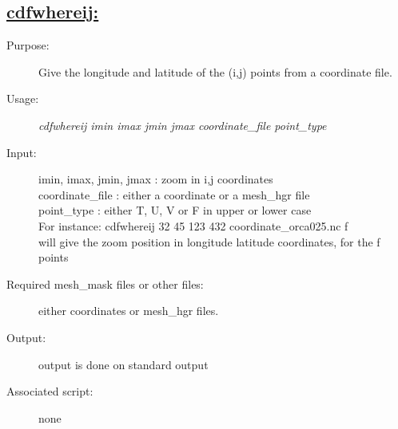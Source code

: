 \documentclass[a4paper,11pt]{article}
\begin{document}
\subsection*{\underline{cdfwhereij:}}
\begin{description}
\item[Purpose:] Give the longitude and latitude of the (i,j) points from a coordinate file.
\item[Usage:] {\em cdfwhereij  imin imax jmin jmax coordinate\_file point\_type }
\item[Input:] imin, imax, jmin, jmax : zoom in i,j coordinates \\
      coordinate\_file : either a coordinate or a mesh\_hgr file \\
      point\_type : either T, U, V or F in upper or lower case \\
For instance: cdfwhereij   32 45 123 432 coordinate\_orca025.nc f \\
will give the zoom position in longitude latitude coordinates, for the f points 
\item[Required mesh\_mask files or other files:] either coordinates or mesh\_hgr files.
\item[Output:] output is done on standard output
\item[Associated script:] none
\end{description}

\newpage
\end{document}
